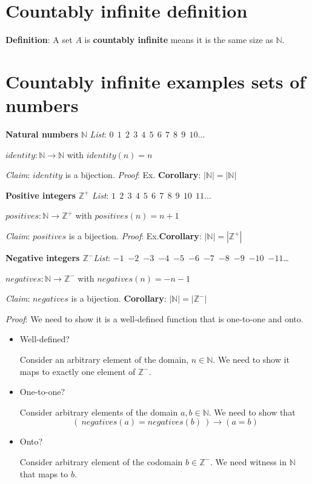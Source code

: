 \documentclass[12pt, oneside]{article}
\begin{document}
\section*{Countably infinite definition}


{\bf Definition}: A set $A$ is {\bf countably infinite} means it is the 
same size as $\mathbb{N}$.

 \vfill
\section*{Countably infinite examples sets of numbers}


{\bf Natural numbers} $\mathbb{N}$ \hfill {\it List}:  $0~~1~~2~~3~~4~~5~~6~~7~~8~~9~~10 \ldots$

$identity: \mathbb{N} \to \mathbb{N}$ with $identity(n) = n$

{\it Claim}: $identity$ is a bijection. {\it Proof}: Ex. \hfill {\bf Corollary}: $ | \mathbb{N} | = |\mathbb{N}|~$

{\bf Positive integers} $\mathbb{Z}^+$ \hfill {\it List}:  $1~~2~~3~~4~~5~~6~~7~~8~~9~~10~~11\ldots$

$positives: \mathbb{N} \to \mathbb{Z}^+$ with $positives(n) = n+1$

{\it Claim}: $positives$ is a bijection.  {\it Proof}: Ex.\hfill {\bf Corollary}: $ | \mathbb{N} | = |\mathbb{Z}^+|$

{\bf Negative integers $\mathbb{Z}^-$}\hfill  {\it List}: $-1$~$-2$~$-3$~$-4$~$-5$~$-6$~$-7$~$-8$~$-9$~$-10$~$-11$\ldots

$negatives: \mathbb{N} \to \mathbb{Z}^-$ with $negatives(n) = -n-1$

{\it Claim}: $negatives$ is a bijection. \hfill {\bf Corollary}: $ | \mathbb{N} | = |\mathbb{Z}^-|$

{\it Proof}: We need to show it is a well-defined function that is one-to-one and onto.

\begin{itemize}
\item Well-defined? 

Consider an arbitrary element of the domain, $n \in \mathbb{N}$. We need to show it maps to exactly one element of $\mathbb{Z}^-$.

\vfill

\item One-to-one?


Consider arbitrary elements of the domain $a, b \in \mathbb{N}$. We need to show that 
$$\left(~negatives(a) = negatives(b) ~\right) \to (a=b)$$

\vfill

\item Onto?

Consider arbitrary element of the codomain $b \in \mathbb{Z}^-$. We need witness in $\mathbb{N}$ that maps to $b$.

\vfill
\end{itemize}
\end{document}
